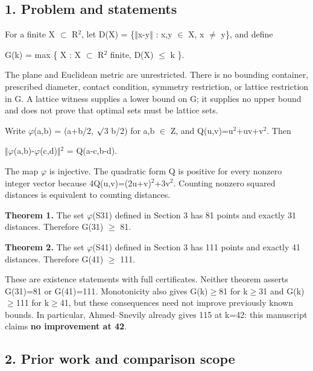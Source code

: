 \documentclass[
]{article}
\begin{document}
\subsection{1. Problem and statements}\label{problem-and-statements}

For a finite X \ensuremath{\subset} R\ensuremath{{}^2}, let D(X) = \{\ensuremath{\Vert}x-y\ensuremath{\Vert} : x,y \ensuremath{\in} X, x \ensuremath{\ne} y\}, and define

G(k) = max \{ \textbar X\textbar{} : X \ensuremath{\subset} R\ensuremath{{}^2} finite,
\textbar D(X)\textbar{} \ensuremath{\le} k \}.

The plane and Euclidean metric are unrestricted. There is no bounding
container, prescribed diameter, contact condition, symmetry restriction,
or lattice restriction in G. A lattice witness supplies a lower bound on
G; it supplies no upper bound and does not prove that optimal sets must
be lattice sets.

Write \ensuremath{\varphi}(a,b) = (a+b/2, \ensuremath{\surd}3 b/2) for a,b \ensuremath{\in} Z, and Q(u,v)=u\ensuremath{{}^2}+uv+v\ensuremath{{}^2}. Then

\ensuremath{\Vert}\ensuremath{\varphi}(a,b)-\ensuremath{\varphi}(c,d)\ensuremath{\Vert}\ensuremath{{}^2} = Q(a-c,b-d).

The map \ensuremath{\varphi} is injective. The quadratic form Q is positive for every
nonzero integer vector because 4Q(u,v)=(2u+v)\ensuremath{{}^2}+3v\ensuremath{{}^2}. Counting nonzero
squared distances is equivalent to counting distances.

\textbf{Theorem 1.} The set \ensuremath{\varphi}(S31) defined in Section 3 has 81 points
and exactly 31 distances. Therefore G(31) \ensuremath{\ge} 81.

\textbf{Theorem 2.} The set \ensuremath{\varphi}(S41) defined in Section 3 has 111 points
and exactly 41 distances. Therefore G(41) \ensuremath{\ge} 111.

These are existence statements with full certificates. Neither theorem
asserts G(31)=81 or G(41)=111. Monotonicity also gives G(k)\ensuremath{\ge}81 for k\ensuremath{\ge}31
and G(k)\ensuremath{\ge}111 for k\ensuremath{\ge}41, but these consequences need not improve
previously known bounds. In particular, Ahmed--Snevily already gives 115
at k=42: this manuscript claims \textbf{no improvement at 42}.

\subsection{2. Prior work and comparison
scope}\label{prior-work-and-comparison-scope}
\end{document}
